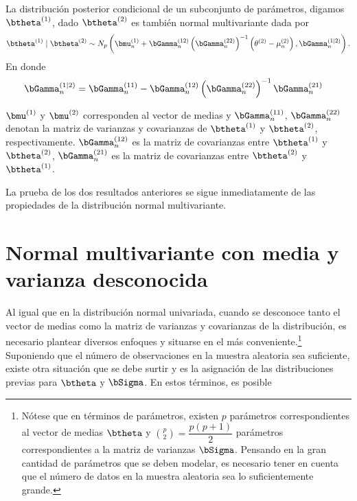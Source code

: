 \documentclass[10pt,openright]{book}\usepackage[]{graphicx}\usepackage[]{color}
\begin{document}
\begin{Res}
  La distribuci\'on posterior condicional de un subconjunto de par\'ametros, digamos $\btheta^{(1)}$, dado $\btheta^{(2)}$ es tambi\'en normal multivariante dada por
  \begin{equation*}
  \btheta^{(1)} \mid \btheta^{(2)} \sim N_p \left(\bmu_n^{(1)}+\bGamma_n^{(12)}\left(\bGamma_n^{(22)}\right)^{-1}
  \left(\theta^{(2)}-\mu_n^{(2)}\right),\bGamma_n^{(1 \mid 2)}\right).
  \end{equation*}
  En donde
  \begin{align}
  \bGamma_n^{(1 \mid 2)}&= \bGamma_n^{(11)}-\bGamma_n^{(12)}\left(\bGamma_n^{(22)}\right)^{-1}\bGamma_n^{(21)}
  \end{align}

$\bmu^{(1)}$ y $\bmu^{(2)}$ corresponden al vector de medias y $\bGamma_n^{(11)}$, $\bGamma_n^{(22)}$ denotan la matriz de varianzas y covarianzas de $\btheta^{(1)}$ y $\btheta^{(2)}$, respectivamente. $\bGamma_n^{(12)}$ es la matriz de covarianzas entre $\btheta^{(1)}$ y $\btheta^{(2)}$, $\bGamma_n^{(21)}$ es la matriz de covarianzas entre $\btheta^{(2)}$ y $\btheta^{(1)}$. 
\end{Res}
  
La prueba de los dos resultados anteriores se sigue inmediatamente de las propiedades de la distribuci\'on normal multivariante.


\section{Normal multivariante con media y varianza desconocida}
  
Al igual que en la distribuci\'on normal univariada, cuando se desconoce tanto el vector de medias como la matriz de varianzas y covarianzas de la distribuci\'on, es necesario plantear diversos enfoques y situarse en el m\'as conveniente.\footnote{N\'otese que en t\'erminos de par\'ametros, existen $p$ par\'ametros correspondientes al vector de medias $\btheta$ y $\binom{p}{2}=\dfrac{p(p+1)}{2}$ par\'ametros correspondientes a la matriz de varianzas $\bSigma$. Pensando en la gran cantidad de par\'ametros que se deben modelar, es necesario tener en cuenta que el n\'umero de datos en la muestra aleatoria sea lo suficientemente grande.} Suponiendo que el n\'umero de observaciones en la muestra aleatoria sea suficiente, existe otra situaci\'on que se debe surtir y es la asignaci\'on de las distribuciones previas para $\btheta$ y $\bSigma$. En estos t\'erminos, es posible
  
\end{document}
